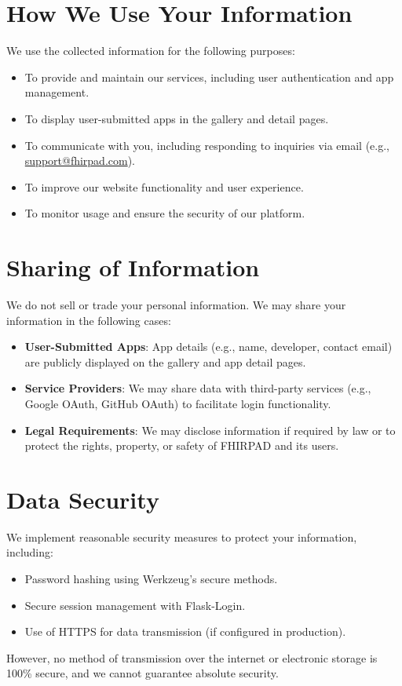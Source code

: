 \documentclass[a4paper,12pt]{article}
\begin{document}
\section{How We Use Your Information}
We use the collected information for the following purposes:
\begin{itemize}
    \item To provide and maintain our services, including user authentication and app management.
    \item To display user-submitted apps in the gallery and detail pages.
    \item To communicate with you, including responding to inquiries via email (e.g., \href{mailto:support@fhirpad.com}{support@fhirpad.com}).
    \item To improve our website functionality and user experience.
    \item To monitor usage and ensure the security of our platform.
\end{itemize}

\section{Sharing of Information}
We do not sell or trade your personal information. We may share your information in the following cases:
\begin{itemize}
    \item \textbf{User-Submitted Apps}: App details (e.g., name, developer, contact email) are publicly displayed on the gallery and app detail pages.
    \item \textbf{Service Providers}: We may share data with third-party services (e.g., Google OAuth, GitHub OAuth) to facilitate login functionality.
    \item \textbf{Legal Requirements}: We may disclose information if required by law or to protect the rights, property, or safety of FHIRPAD and its users.
\end{itemize}

\section{Data Security}
We implement reasonable security measures to protect your information, including:
\begin{itemize}
    \item Password hashing using Werkzeug's secure methods.
    \item Secure session management with Flask-Login.
    \item Use of HTTPS for data transmission (if configured in production).
\end{itemize}
However, no method of transmission over the internet or electronic storage is 100\% secure, and we cannot guarantee absolute security.
\end{document}
